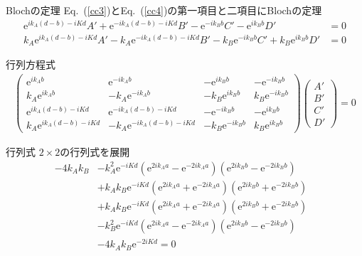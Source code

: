 \documentclass[unicode, 12pt, aspectratio=169]{beamer}
\newcommand{\eref}[1]{Eq.~(\ref{#1})}
\begin{document}
\begin{frame}
  \begin{block}{Blochの定理}
    \eref{cc3}と\eref{cc4}の第一項目と二項目にBlochの定理
    \begin{align}
    \mathrm{e}^{ik_A(d-b)-iKd}A'+\mathrm{e}^{-ik_A(d-b)-iKd}B'-\mathrm{e}^{-ik_Bb}C'-\mathrm{e}^{ik_Bb}D'&=0\label{cc5}\\
    k_A\mathrm{e}^{ik_A(d-b)-iKd}A'-k_A\mathrm{e}^{-ik_A(d-b)-iKd}B'-k_B\mathrm{e}^{-ik_Bb}C'+k_B\mathrm{e}^{ik_Bb}D'&=0\label{cc6}
    \end{align}
  \end{block}
\end{frame}

\begin{frame}
  \begin{block}{行列方程式}
    \begin{align}
    \begin{pmatrix}
    \mathrm{e}^{ik_Ab}&\mathrm{e}^{-ik_Ab}&-\mathrm{e}^{ik_Bb}&-\mathrm{e}^{-ik_Bb}\\
    k_A\mathrm{e}^{ik_Ab}&-k_A\mathrm{e}^{-ik_Ab}&-k_B\mathrm{e}^{ik_Bb}&k_B\mathrm{e}^{-ik_Bb}\\
    \mathrm{e}^{ik_A(d-b)-iKd}&\mathrm{e}^{-ik_A(d-b)-iKd}&-\mathrm{e}^{-ik_Bb}&-\mathrm{e}^{ik_Bb}\\
    k_A\mathrm{e}^{ik_A(d-b)-iKd}&-k_A\mathrm{e}^{-ik_A(d-b)-iKd}&-k_B\mathrm{e}^{-ik_Bb}&k_B\mathrm{e}^{ik_Bb}
    \end{pmatrix}
    \begin{pmatrix}
    A'\\
    B'\\
    C'\\
    D'
    \end{pmatrix}=0
    \end{align}
  \end{block}
\end{frame}

\begin{frame}
  \begin{block}{行列式}
    $2\times2$の行列式を展開
    \begin{align}
    -4k_Ak_B&-k_A^2\mathrm{e}^{-iKd}(\mathrm{e}^{2ik_Aa}-\mathrm{e}^{-2ik_Aa})(\mathrm{e}^{2ik_Bb}-\mathrm{e}^{-2ik_Bb})&\nonumber\\
    &+k_Ak_B\mathrm{e}^{-iKd}(\mathrm{e}^{2ik_Aa}+\mathrm{e}^{-2ik_Aa})(\mathrm{e}^{2ik_Bb}+\mathrm{e}^{-2ik_Bb})&\nonumber\\
    &+k_Ak_B\mathrm{e}^{-iKd}(\mathrm{e}^{2ik_Aa}+\mathrm{e}^{-2ik_Aa})(\mathrm{e}^{2ik_Bb}+\mathrm{e}^{-2ik_Bb})&\nonumber\\
    &-k_B^2\mathrm{e}^{-iKd}(\mathrm{e}^{2ik_Aa}-\mathrm{e}^{-2ik_Aa})(\mathrm{e}^{2ik_Bb}-\mathrm{e}^{-2ik_Bb})&\nonumber\\
    &-4k_Ak_B\mathrm{e}^{-2iKd}=0&
    \end{align}
  \end{block}
\end{frame}
\end{document}

